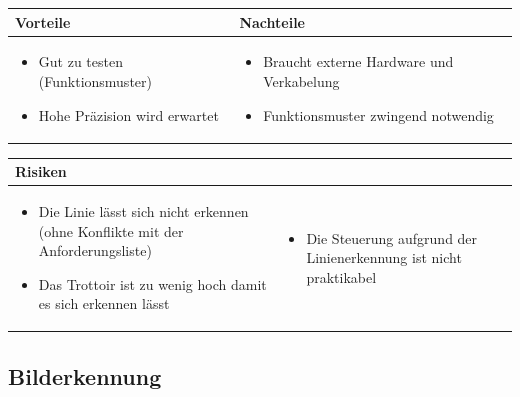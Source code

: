 \begin{table}[h]
\begin{tabular}{p{} | p{}}


 \textbf{Vorteile} & \textbf{Nachteile} \\ \hline
	 
\begin{itemize}
\item Gut zu testen (Funktionsmuster)
\item Hohe Präzision wird erwartet
\end{itemize}

 
 &
 
\begin{itemize}
\item Braucht externe Hardware und Verkabelung
\item Funktionsmuster zwingend notwendig
\end{itemize}

\end{tabular}
\end{table}

\begin{table}[h]
\begin{tabular}{p{}p{}}

 \textbf{Risiken} & \\ \hline
	 
\begin{itemize}
\item Die Linie lässt sich nicht erkennen (ohne Konflikte mit der Anforderungsliste)
\item Das Trottoir ist zu wenig hoch damit es sich erkennen lässt
\end{itemize}
&
\begin{itemize}
\item Die Steuerung aufgrund der Linienerkennung ist nicht praktikabel
\end{itemize}

 
\end{tabular}
\end{table}

\pagebreak


\subsection{Bilderkennung}


